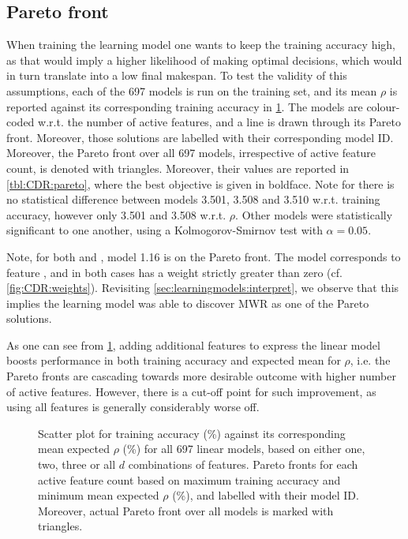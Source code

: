 \documentclass[smallextended]{svjour3}
\begin{document}
\subsection{Pareto front}\label{sec:CDR:pareto}
When training the learning model one wants to keep the training accuracy high, as that would imply a higher likelihood of making optimal decisions, which would in turn translate into a low final makespan. To test the validity of this assumptions, each of the 697 models is run on the training set, and its mean $\rho$ is reported against its corresponding training accuracy in \cref{fig:CDR:scatter}. The models are colour-coded w.r.t. the number of active features, and a line is drawn through its Pareto front. Moreover, those solutions are labelled with their corresponding model ID. Moreover, the Pareto front over all 697 models, irrespective of active feature count, is denoted with triangles. Moreover, their values are reported in \cref{tbl:CDR:pareto}, where the best objective is given in boldface. 
Note for   there is no statistical difference between models 3.501, 3.508 and 3.510 w.r.t. training accuracy, however only 3.501 and 3.508 w.r.t. $\rho$. Other models were statistically significant to one another, using a Kolmogorov-Smirnov test with $\alpha=0.05$.\label{sec:expr:ks}

Note, for both  and , model 1.16 is on the Pareto front. The model corresponds to feature \phiwrmJob, and in both cases has a weight strictly greater than zero (cf. \cref{fig:CDR:weights}). Revisiting \cref{sec:learningmodels:interpret}, we observe that this implies the learning model was able to discover MWR as one of the Pareto solutions. 

As one can see from \cref{fig:CDR:scatter}, adding additional features to express the linear model boosts performance in both training accuracy and expected mean for $\rho$, i.e. the Pareto fronts are cascading towards more desirable outcome with higher number  of active features. However, there is a cut-off point for such improvement, as using all features is generally considerably worse off. 

\begin{figure}[t]
\centering
{}%
\caption{Scatter plot for training accuracy  (\%) against its corresponding mean expected $\rho$ (\%) for all 697 linear models, based on either one, two, three or all $d$ combinations of features.
Pareto fronts for each active feature count based on maximum training accuracy and minimum mean expected $\rho$ (\%), and labelled with their model ID. Moreover, actual Pareto front over all models is marked with triangles.} \label{fig:CDR:scatter}
\end{figure}
\end{document}

